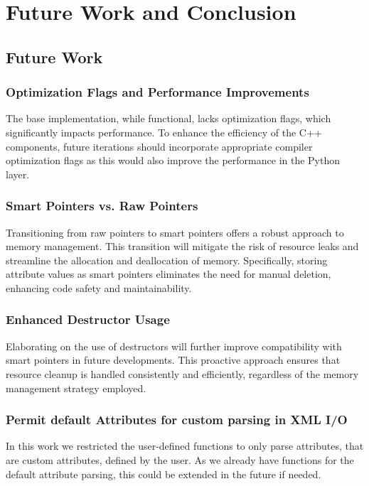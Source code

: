 \chapter{Future Work and Conclusion}\label{chapter:fw_conc} 

\section{Future Work}

\subsection{Optimization Flags and Performance Improvements}

The base implementation, while functional, lacks optimization flags, which significantly impacts performance. To enhance the efficiency of the C++ components, future iterations should incorporate appropriate compiler optimization flags as this would also improve the performance in the Python layer.

\subsection{Smart Pointers vs. Raw Pointers}

Transitioning from raw pointers to smart pointers offers a robust approach to memory management. This transition will mitigate the risk of resource leaks and streamline the allocation and deallocation of memory. Specifically, storing attribute values as smart pointers eliminates the need for manual deletion, enhancing code safety and maintainability.

\subsection{Enhanced Destructor Usage}

Elaborating on the use of destructors will further improve compatibility with smart pointers in future developments. This proactive approach ensures that resource cleanup is handled consistently and efficiently, regardless of the memory management strategy employed.

\subsection{Permit default Attributes for custom parsing in XML I/O}

In this work we restricted the user-defined functions to only parse attributes, that are custom attributes, defined by the user. As we already have functions for the default attribute parsing, this could be extended in the future if needed.

